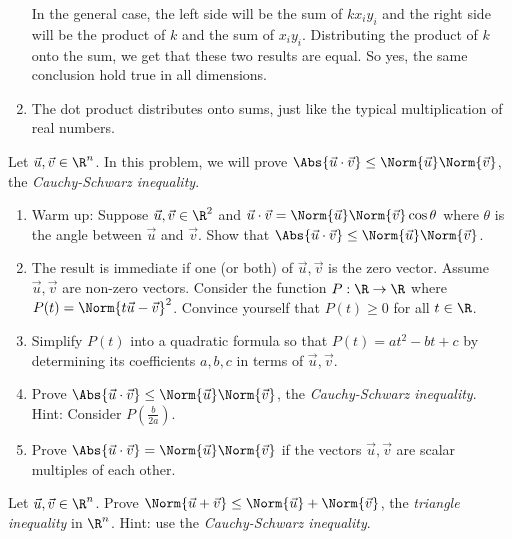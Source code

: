 \begin{exercises}
\begin{problist}
\begin{solution}
\begin{enumerate}
				In the general case, the left side will be the sum of $kx_iy_i$ and the right side will 
				be the product of $k$ and the sum of $x_iy_i$. Distributing the product of $k$ onto the 
				sum, we get that these two results are equal. So yes, the same conclusion hold true in 
				all dimensions.
				
				\item The dot product distributes onto sums, just like the typical multiplication of 
				real numbers.
			\end{enumerate}
		\end{solution}
	
		\prob Let $\vec u, \vec v \in \R^{n}$. In this problem, we will prove
		$\Abs{\vec u \cdot \vec v}\leq \Norm{\vec u}\Norm{\vec v}$, the \emph{Cauchy-Schwarz
		inequality}.
		\begin{enumerate}
			\item Warm up: Suppose $\vec u, \vec v \in \R^{2}$ and $\vec u \cdot
				\vec v = \Norm{\vec u}\Norm{\vec v}\cos \theta$ where $\theta$ is
				the angle between $\vec u$ and $\vec v$. Show that
				$\Abs{\vec u \cdot \vec v}\leq \Norm{\vec u}\Norm{\vec v}$.

			\item The result is immediate if one (or both) of $\vec u, \vec v$
				is the zero vector. Assume $\vec u, \vec v$ are non-zero vectors.
				Consider the function $P: \R \to \R$ where
				$P(t) = \Norm{t\vec u - \vec v}^{2}$. Convince yourself that $P(
				t) \geq 0$ for all $t \in \R$.

			\item Simplify $P(t)$ into a quadratic formula so that
				$P(t) = at^{2} - bt + c$ by determining its coefficients
				$a, b, c$ in terms of $\vec u, \vec v$.

			\item Prove
				$\Abs{\vec u \cdot \vec v}\leq \Norm{\vec u}\Norm{\vec v}$, the \emph{Cauchy-Schwarz
				inequality}. Hint: Consider $P(\frac{b}{2a})$.

			\item Prove $\Abs{\vec u \cdot \vec v}= \Norm{\vec u}\Norm{\vec v}$
				if the vectors $\vec u, \vec v$ are scalar multiples of each
				other.
		\end{enumerate}

		\prob Let $\vec u, \vec v \in \R^{n}$. Prove $\Norm{\vec u + \vec v}\leq
		\Norm{\vec u}+ \Norm{\vec v}$, the \emph{triangle inequality} in
		$\R^{n}$. Hint: use the \emph{Cauchy-Schwarz inequality}.


\end{problist}
\end{exercises}
